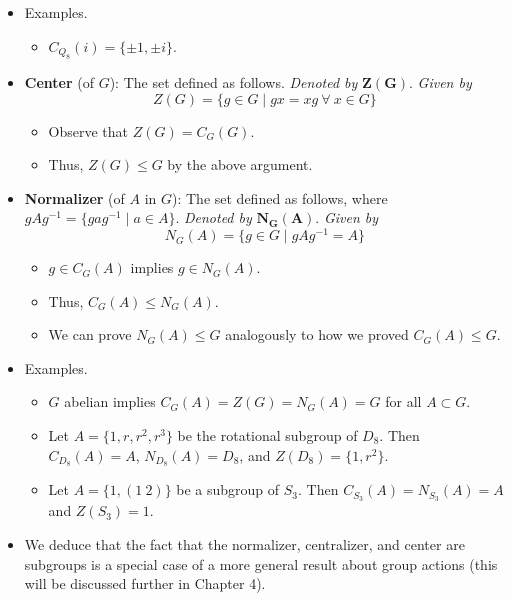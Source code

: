 \documentclass[../notes.tex]{subfiles}
\begin{document}
\begin{itemize}
\begin{proof}
        as desired.
    \end{proof}
    \item Examples.
    \begin{itemize}
        \item $C_{Q_8}(i)=\{\pm 1,\pm i\}$.
    \end{itemize}
    \item \textbf{Center} (of $G$): The set defined as follows. \emph{Denoted by} $\bm{Z(G)}$. \emph{Given by}
    \begin{equation*}
        Z(G) = \{g\in G\mid gx=xg\ \forall\ x\in G\}
    \end{equation*}
    \begin{itemize}
        \item Observe that $Z(G)=C_G(G)$.
        \item Thus, $Z(G)\leq G$ by the above argument.
    \end{itemize}
    \item \textbf{Normalizer} (of $A$ in $G$): The set defined as follows, where $gAg^{-1}=\{gag^{-1}\mid a\in A\}$. \emph{Denoted by} $\bm{N_G(A)}$. \emph{Given by}
    \begin{equation*}
        N_G(A) = \{g\in G\mid gAg^{-1}=A\}
    \end{equation*}
    \begin{itemize}
        \item $g\in C_G(A)$ implies $g\in N_G(A)$.
        \item Thus, $C_G(A)\leq N_G(A)$.
        \item We can prove $N_G(A)\leq G$ analogously to how we proved $C_G(A)\leq G$.
    \end{itemize}
    \item Examples.
    \begin{itemize}
        \item $G$ abelian implies $C_G(A)=Z(G)=N_G(A)=G$ for all $A\subset G$.
        \item Let $A=\{1,r,r^2,r^3\}$ be the rotational subgroup of $D_8$. Then $C_{D_8}(A)=A$, $N_{D_8}(A)=D_8$, and $Z(D_8)=\{1,r^2\}$.
        \item Let $A=\{1,(1\ 2)\}$ be a subgroup of $S_3$. Then $C_{S_3}(A)=N_{S_3}(A)=A$ and $Z(S_3)=1$.
    \end{itemize}
    \item We deduce that the fact that the normalizer, centralizer, and center are subgroups is a special case of a more general result about group actions (this will be discussed further in Chapter 4).

\end{itemize}
\end{document}
